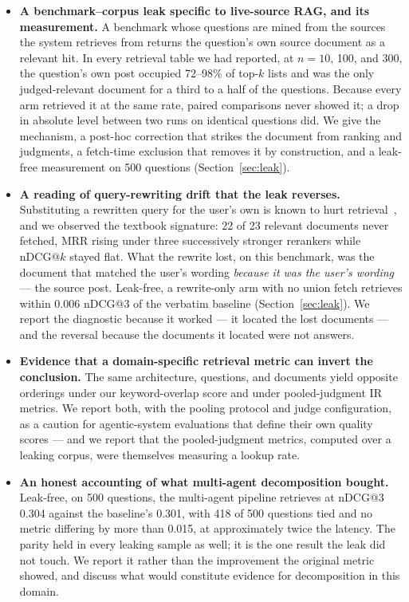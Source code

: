 \documentclass[acmsmall,review,anonymous,screen]{acmart}
\begin{document}
\begin{itemize}
  \item \textbf{A benchmark--corpus leak specific to live-source RAG, and its
  measurement.} A benchmark whose questions are mined from the sources the
  system retrieves from returns the question's own source document as a
  relevant hit. In every retrieval table we had reported, at $n=10$, 100, and
  300, the question's own post occupied 72--98\% of top-$k$ lists and was the
  only judged-relevant document for a third to a half of the questions. Because
  every arm retrieved it at the same rate, paired comparisons never showed it;
  a drop in absolute level between two runs on identical questions did. We give
  the mechanism, a post-hoc correction that strikes the document from ranking
  and judgments, a fetch-time exclusion that removes it by construction, and a
  leak-free measurement on 500 questions (Section~\ref{sec:leak}).

  \item \textbf{A reading of query-rewriting drift that the leak reverses.}
  Substituting a rewritten query for the user's own is known to hurt
  retrieval~\cite{wang2023query2doc,gao2024dmqr,zighelnic2008drift}, and we
  observed the textbook signature: 22 of 23 relevant documents never fetched,
  MRR rising under three successively stronger rerankers while nDCG@$k$ stayed
  flat. What the rewrite lost, on this benchmark, was the document that matched
  the user's wording \emph{because it was the user's wording} --- the source
  post. Leak-free, a rewrite-only arm with no union fetch retrieves within 0.006
  nDCG@3 of the verbatim baseline (Section~\ref{sec:leak}). We report the
  diagnostic because it worked --- it located the lost documents --- and the
  reversal because the documents it located were not answers.

  \item \textbf{Evidence that a domain-specific retrieval metric can invert the
  conclusion.} The same architecture, questions, and documents yield opposite
  orderings under our keyword-overlap score and under pooled-judgment IR
  metrics. We report both, with the pooling protocol and judge configuration, as
  a caution for agentic-system evaluations that define their own quality scores
  --- and we report that the pooled-judgment metrics, computed over a leaking
  corpus, were themselves measuring a lookup rate.

  \item \textbf{An honest accounting of what multi-agent decomposition bought.}
  Leak-free, on 500 questions, the multi-agent pipeline retrieves at nDCG@3
  0.304 against the baseline's 0.301, with 418 of 500 questions tied and no
  metric differing by more than 0.015, at approximately twice the latency. The
  parity held in every leaking sample as well; it is the one result the leak did
  not touch. We report it rather than the improvement the original metric
  showed, and discuss what would constitute evidence for decomposition in this
  domain.


\end{itemize}
\end{document}
